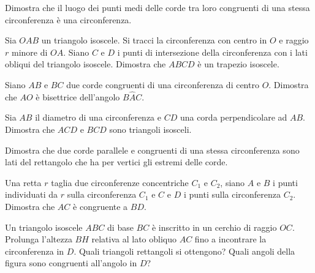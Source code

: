 \begin{multicols}{2}

\begin{esercizio}
\label{ese:5.6}
Dimostra che il luogo dei punti medi delle corde tra loro congruenti 
di una stessa circonferenza è una circonferenza.
\end{esercizio}

\begin{esercizio}
\label{ese:5.8}
Sia $OAB$ un triangolo isoscele. Si tracci la circonferenza con 
centro in $O$ e raggio $r$ minore di $OA$. Siano $C$ e $D$ i punti di 
intersezione della circonferenza con i lati obliqui del triangolo 
isoscele. Dimostra che $ABCD$ è un trapezio isoscele.
\end{esercizio}

\begin{esercizio}
\label{ese:5.9}
Siano $AB$ e $BC$ due corde congruenti di una circonferenza di centro 
$O$. Dimostra che $AO$ è bisettrice dell'angolo $B\widehat{A}C$.
\end{esercizio}


\begin{esercizio}
\label{ese:5.18}
Sia $AB$ il diametro di una circonferenza e $CD$ una corda 
perpendicolare ad $AB$. Dimostra che $ACD$ e $BCD$ sono triangoli 
isosceli.
\end{esercizio}

\begin{esercizio}
\label{ese:5.19}
Dimostra che due corde parallele e congruenti di una stessa 
circonferenza sono lati del rettangolo che ha per vertici gli estremi 
delle corde.
\end{esercizio}



\begin{esercizio}
\label{ese:5.22}
Una retta $r$ taglia due circonferenze concentriche $C_1$ e $C_2$, 
siano $A$ e $B$ i punti individuati da $r$ sulla circonferenza $C_1$ 
e $C$ e $D$ i punti sulla circonferenza $C_2$. Dimostra che $AC$ è 
congruente a $BD$.
\end{esercizio}

\begin{esercizio}
\label{ese:5.23}
Un triangolo isoscele $ABC$ di base $BC$ è inscritto in un cerchio di 
raggio $OC$. Prolunga l'altezza $BH$ relativa al lato obliquo $AC$ 
fino a incontrare la circonferenza in $D$. Quali triangoli rettangoli 
si ottengono? Quali angoli della figura sono congruenti all'angolo in 
$D$?
\end{esercizio}


\end{multicols}
